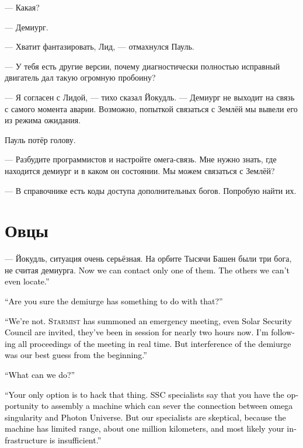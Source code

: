 \documentclass[a4paper,10pt,fleqn]{book}\usepackage{polyglossia}\setdefaultlanguage{english}\setotherlanguage{russian}\defaultfontfeatures{Ligatures=TeX,Mapping=tex-text}\usepackage{xcolor}\definecolor{lightgray}{HTML}{bbbbbb}\color{lightgray}\newcommand{\ml}[3]{\textcolor{black}{#3}}
\begin{document}
--- Какая?

--- Демиург.

--- Хватит фантазировать, Лид, --- отмахнулся Пауль.

--- У тебя есть другие версии, почему диагностически полностью исправный двигатель дал такую огромную пробоину?

--- Я согласен с Лидой, --- тихо сказал Йокудль.
--- Демиург не выходит на связь с самого момента аварии.
Возможно, попыткой связаться с Землёй мы вывели его из режима ожидания.

Пауль потёр голову.

--- Разбудите программистов и настройте омега-связь.
Мне нужно знать, где находится демиург и в каком он состоянии.
Мы можем связаться с Землёй?

--- В справочнике есть коды доступа дополнительных богов.
Попробую найти их.

\section{Овцы}

--- Йокудль, ситуация очень серьёзная.
На орбите Тысячи Башен были три бога, не считая демиурга.
\ml{$0$}
{Сейчас на связь выходит один.}
{Now we can contact only one of them.}
\ml{$0$}
{Прочих мы даже не можем локализовать.}
{The others we can't even locate.''}

\ml{$0$}
{--- Вы уверены, что это проделки демиурга?}
{``Are you sure the demiurge has something to do with that?''}

\ml{$0$}
{--- Сложно сказать.}
{``We're not.}
\ml{$0$}
{<<Стармист>> собрал срочный консилиум, подключили Совет Безопасности Солнечной системы, они заседают уже два часа.}
{\textsc{Starmist} has summoned an emergency meeting, even Solar Security Council are invited, they've been in session for nearly two hours now.}
\ml{$0$}
{Я слежу за ходом совещания в реальном времени.}
{I'm following all proceedings of the meeting in real time.}
\ml{$0$}
{Но версия с демиургом была основной с самого начала.}
{But interference of the demiurge was our best guess from the beginning.''}

\ml{$0$}
{--- Мы можем что-то сделать?}
{``What can we do?''}

\ml{$0$}
{--- Только прямой взлом.}
{``Your only option is to hack that thing.}
\ml{$0$}
{Специалисты СБ утверждают, что ещё есть возможность собрать установку для принудительного отсоединения омега-сингулярности от мира Фотона.}
{SSC specialists say that you have the opportunity to assembly a machine which can sever the connection between omega singularity and Photon Universe.}
\ml{$0$}
{Но наши специалисты относятся к этому скептически --- установка действует на ограниченном расстоянии, порядка миллиона километров, и у вас скорее всего не хватит инфраструктуры.}
{But our specialists are skeptical, because the machine has limited range, about one million kilometers, and most likely your infrastructure is insufficient.''}
\end{document}
